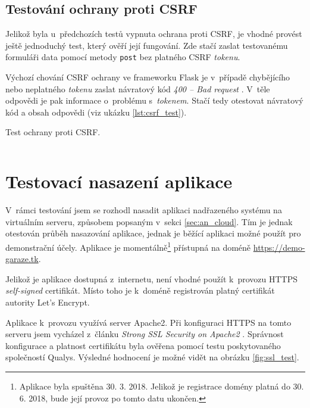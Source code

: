 \subsection{Testování ochrany proti CSRF}
\label{sec:te_csrf}

Jelikož byla u~předchozích testů vypnuta ochrana proti CSRF, je vhodné provést ještě jednoduchý test, který ověří její fungování. Zde stačí zaslat testovanému formuláři data pomocí metody \texttt{post} bez platného CSRF \textit{tokenu}.

Výchozí chování CSRF ochrany ve frameworku Flask je v~případě chybějícího nebo neplatného \textit{tokenu} zaslat návratový kód \textit{400 -- Bad request} \cite{flask_wtf}. V~těle odpovědi je pak informace o~problému s~\textit{tokenem}. Stačí tedy otestovat návratový kód a obsah odpovědi (viz ukázku \ref{lst:csrf_test}).

\begin{listing}[htbp]
\caption{\label{lst:csrf_test} Test ochrany proti CSRF.}
\inputminted[bgcolor=codebg]{python}{source-samples/csrf_test.py}
\end{listing}

\section{Testovací nasazení aplikace}
\label{sec:te_deployment}

V~rámci testování jsem se rozhodl nasadit aplikaci nadřazeného systému na virtuálním serveru, způsobem popsaným v~sekci \ref{sec:an_cloud}. Tím je jednak otestován průběh nasazování aplikace, jednak je běžící aplikaci možné použít pro demonstrační účely. Aplikace je momentálně\footnote{Aplikace byla spuštěna 30. 3. 2018. Jelikož je registrace domény platná do 30. 6. 2018, bude její provoz po tomto datu ukončen.} přístupná na doméně \url{https://demo-garaze.tk}.

Jelikož je aplikace dostupná z~internetu, není vhodné použít k~provozu HTTPS \textit{self-signed} certifikát. Místo toho je k~doméně registrován platný certifikát autority Let's Encrypt.

Aplikace k~provozu využívá server Apache2. Při konfiguraci HTTPS na tomto serveru jsem vycházel z~článku \textit{Strong SSL Security on Apache2} \cite{apache_ssl}. Správnost konfigurace a platnost certifikátu byla ověřena pomocí testu poskytovaného společností Qualys. Výsledné hodnocení je možné vidět na obrázku \ref{fig:ssl_test}.

